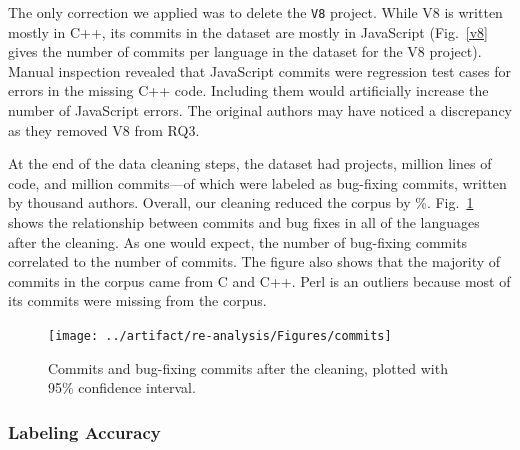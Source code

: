 \documentclass[acmsmall]{acmart}
\newcommand{\pct}[1]{#1\!\!\%\xspace}
\renewcommand{\c}{{\sf  C}\xspace}
\newcommand{\cpp}{{\sf  C++}\xspace}
\newcommand{\js}{{\sf  JavaScript}\xspace}
\newcommand{\perl}{{\sf  Perl}\xspace}
\newcommand{\code}[1]{{\tt\small #1}\xspace}
\begin{document}
The only correction we applied was to delete the \code{V8} project. While V8
is written mostly in \cpp, its commits in the dataset are mostly in \js
(Fig.~\ref{v8} gives the number of commits per language in the dataset for
the V8 project).  Manual inspection revealed that \js commits were
regression test cases for errors in the missing \cpp code. Including them
would artificially increase the number of \js errors.  The original authors
may have noticed a discrepancy as they removed V8 from RQ3.

\vspace{2mm}

At the end of the data cleaning steps, the dataset had
\finalNumberOfProjectsIncluded projects, \finalSlocMio million lines of
code, and \finalNumShaMio million commits---of which \finalNumberOfBugFixes
were labeled as bug-fixing commits, written by \finalNumberAuthors thousand
authors.  Overall, our cleaning reduced the corpus by
\pct{\ratioReducedShaRows}.  Fig.~\ref{com} shows the relationship between
commits and bug fixes in all of the languages after the cleaning. As one
would expect, the number of bug-fixing commits correlated to the number of
commits. The figure also shows that the majority of commits in the corpus
came from \c and \cpp. \perl is an outliers because most of its commits were
missing from the corpus.


\begin{figure}[!h]
\centering\texttt{[image: ../artifact/re-analysis/Figures/commits]}
\vspace{-1mm}
\caption{Commits and bug-fixing commits  after the cleaning, plotted with 95\% confidence interval.}\label{com}
\vspace{-3mm}\end{figure}

\subsubsection{Labeling Accuracy}\label{falselabels}
\end{document}
